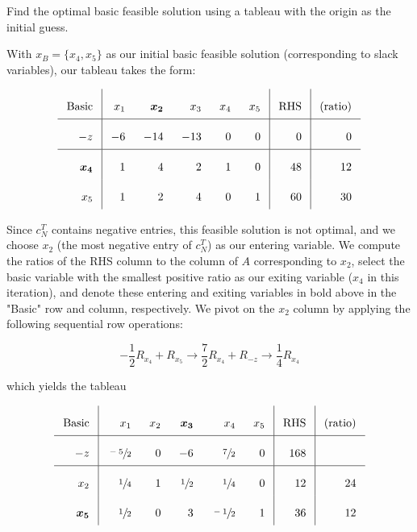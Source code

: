 Find the optimal basic feasible solution using a tableau with the origin as the initial guess.

\begin{solution}
  With $x_B = \{ x_4, x_5 \}$ as our initial basic feasible solution (corresponding to slack variables), our tableau
  takes the form:

  \[\arraycolsep=8pt\def\arraystretch{2.2}
  \begin{array}{r|rrrrr|r|r}
     \text{Basic} &  x_1  &  \bm{x_2}  &  x_3  &  x_4  & x_5 &  \text{RHS} & \text{(ratio)}  \\ \hline
    -z            &  -6   &  -14       &  -13  &   0   &  0  &   0         & 0               \\ \hline
     \bm{x_4}     &   1   &   4        &   2   &   1   &  0  &  48         & 12              \\
     x_5          &   1   &   2        &   4   &   0   &  1  &  60         & 30
  \end{array}
  \]

  Since $c_N^T$ contains negative entries, this feasible solution is not optimal, and we choose $x_2$ (the most negative
  entry of $c_N^T$) as our entering variable. We compute the ratios of the RHS column to the column of $A$ corresponding
  to $x_2$, select the basic variable with the smallest positive ratio as our exiting variable ($x_4$ in this 
  iteration), and denote these entering and exiting variables in bold above in the "Basic" row and column, 
  respectively. We pivot on the $x_2$ column by applying the following sequential row operations:

  $$
  -\frac{1}{2} R_{x_4} + R_{x_5}  \longrightarrow \frac{7}{2} R_{x_4} + R_{-z} \longrightarrow \frac{1}{4} R_{x_4}
  $$

  which yields the tableau
  
  \[\arraycolsep=8pt\def\arraystretch{2.2}
  \begin{array}{r|rrrrr|r|r}
     \text{Basic} &  x_1           &  x_2 &  \bm{x_3}      &   x_4           &   x_5 & \text{RHS}  & \text{(ratio)}  \\ \hline
     -z           &  \sfrac{-5}{2} &  0   &  -6            &   \sfrac{7}{2}  &   0   &  168        &                 \\ \hline
      x_2         &  \sfrac{1}{4}  &  1   &   \sfrac{1}{2} &   \sfrac{1}{4}  &   0   &  12         & 24              \\
     \bm{x_5}     &  \sfrac{1}{2}  &  0   &   3            &   \sfrac{-1}{2} &   1   &  36         & 12              
  \end{array}
  \]


\end{solution}
